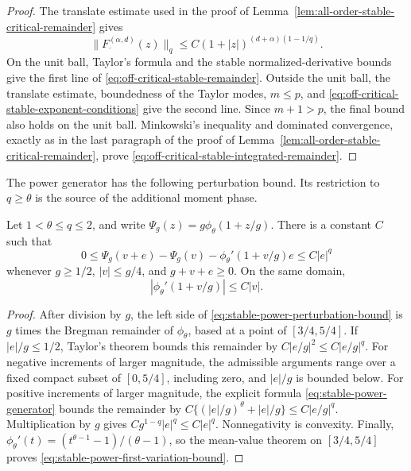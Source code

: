\begin{proof}
The translate estimate used in the proof of
Lemma~\ref{lem:all-order-stable-critical-remainder} gives
\[
 \|F_\cdot^{(\alpha,d)}(z)\|_q
 \le C(1+|z|)^{(d+\alpha)(1-1/q)}.
\]
On the unit ball, Taylor's formula and the stable normalized-derivative
bounds give the first line of
\eqref{eq:off-critical-stable-remainder}.  Outside the unit ball, the
translate estimate, boundedness of the Taylor modes, \(m\le p\), and
\eqref{eq:off-critical-stable-exponent-conditions} give the second line.
Since \(m+1>p\), the final bound also holds on the unit ball.  Minkowski's
inequality and dominated convergence, exactly as in the last paragraph of
the proof of Lemma~\ref{lem:all-order-stable-critical-remainder}, prove
\eqref{eq:off-critical-stable-integrated-remainder}.
\end{proof}

The power generator has the following perturbation bound.  Its restriction
to \(q\ge\theta\) is the source of the additional moment phase.

\begin{lemma}
\label{lem:stable-power-perturbation}
Let \(1<\theta\le q\le2\), and write
\(\Psi_g(z)=g\phi_\theta(1+z/g)\).  There is a constant \(C\) such that
\begin{equation}\label{eq:stable-power-perturbation-bound}
 0\le \Psi_g(v+e)-\Psi_g(v)
 -\phi_\theta'(1+v/g)e\le C|e|^q
\end{equation}
whenever \(g\ge1/2\), \(|v|\le g/4\), and \(g+v+e\ge0\).  On the same
domain,
\begin{equation}\label{eq:stable-power-first-variation-bound}
 |\phi_\theta'(1+v/g)|\le C|v|.
\end{equation}
\end{lemma}

\begin{proof}
After division by \(g\), the left side of
\eqref{eq:stable-power-perturbation-bound} is \(g\) times the Bregman
remainder of \(\phi_\theta\), based at a point of \([3/4,5/4]\).  If
\(|e|/g\le1/2\), Taylor's theorem bounds this remainder by
\(C|e/g|^2\le C|e/g|^q\).  For negative increments of larger magnitude,
the admissible arguments range over a fixed compact subset of
\([0,5/4]\), including zero, and \(|e|/g\) is bounded below.  For positive
increments of larger magnitude, the explicit formula
\eqref{eq:stable-power-generator} bounds the remainder by
\(C\{(|e|/g)^\theta+|e|/g\}\le C|e/g|^q\).
Multiplication by \(g\) gives \(Cg^{1-q}|e|^q\le C|e|^q\).
Nonnegativity is convexity.  Finally,
\(\phi_\theta'(t)=(t^{\theta-1}-1)/(\theta-1)\), so the mean-value
theorem on \([3/4,5/4]\) proves
\eqref{eq:stable-power-first-variation-bound}.
\end{proof}

